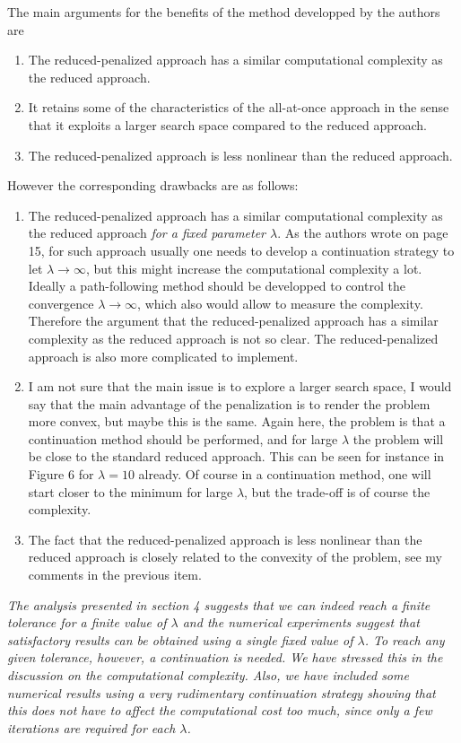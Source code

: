 \documentclass[12pt]{article}
\begin{document}
The main arguments for the benefits of the method developped by the authors are 
\begin{enumerate} 
\item The reduced-penalized approach has a similar computational complexity as the reduced approach. 
\item It retains some of the characteristics of the all-at-once approach in the sense that it exploits a larger search space compared to the reduced approach. 
\item The reduced-penalized approach is less nonlinear than the reduced approach. 
\end{enumerate} 
% 
However the corresponding drawbacks are as follows: 
\begin{enumerate} 
\item The reduced-penalized approach has a similar computational complexity as the reduced approach {\it for a fixed parameter $\lambda$}. As the authors wrote on page 15, for such approach usually one needs to develop a continuation strategy to let $\lambda\to\infty$, but this might increase the computational complexity a lot. Ideally a path-following method should be developped to control the convergence $\lambda\to\infty$, which also would allow to measure the complexity. Therefore the argument that the reduced-penalized approach has a similar complexity as the reduced approach is not so clear. The reduced-penalized approach is also more complicated to implement. 
\item I am not sure that the main issue is to explore a larger search space, I would say that the main advantage of the penalization is to render the problem more convex, but maybe this is the same. Again here, the problem is that a continuation method should be performed, and for large $\lambda$ the problem will be close to the standard reduced approach. This can be seen for instance in Figure 6 for $\lambda=10$ already. Of course in a continuation method, one will start closer to the minimum for large $\lambda$, but the trade-off is of course the complexity. 
\item The fact that the reduced-penalized approach is less nonlinear than the reduced approach is closely related to the convexity of the problem, see my comments in the previous item. 
\end{enumerate} 

\vspace{5mm}

\emph{The analysis presented in section 4 suggests that we can indeed reach a finite tolerance for a finite value of $\lambda$ and the numerical experiments suggest that satisfactory results can be obtained using a single fixed value of $\lambda$. To reach any given tolerance, however, a continuation is needed. We have stressed this in the discussion on the computational complexity. Also, we have included some numerical results using a very rudimentary continuation strategy showing that this does not have to affect the computational cost too much, since only a few iterations are required for each $\lambda$.}
\end{document}
